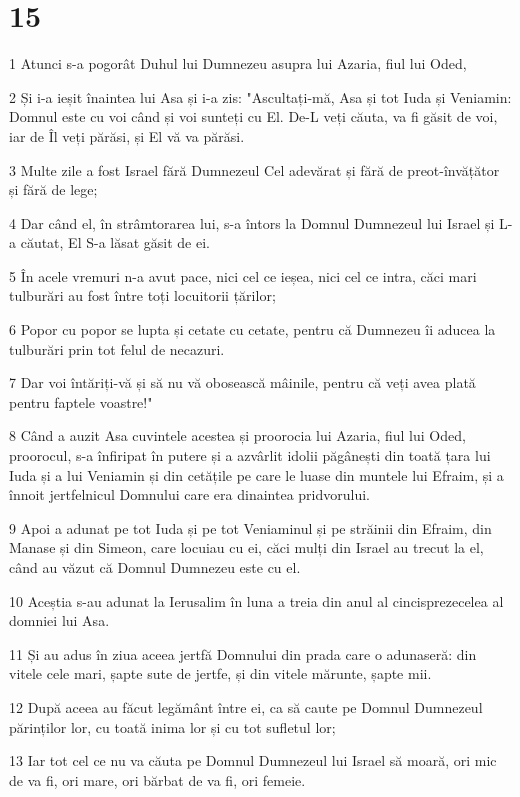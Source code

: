 \chapter{15}

\par 1 Atunci s-a pogorât Duhul lui Dumnezeu asupra lui Azaria, fiul lui Oded,
\par 2 Și i-a ieșit înaintea lui Asa și i-a zis: "Ascultați-mă, Asa și tot Iuda și Veniamin: Domnul este cu voi când și voi sunteți cu El. De-L veți căuta, va fi găsit de voi, iar de Îl veți părăsi, și El vă va părăsi.
\par 3 Multe zile a fost Israel fără Dumnezeul Cel adevărat și fără de preot-învățător și fără de lege;
\par 4 Dar când el, în strâmtorarea lui, s-a întors la Domnul Dumnezeul lui Israel și L-a căutat, El S-a lăsat găsit de ei.
\par 5 În acele vremuri n-a avut pace, nici cel ce ieșea, nici cel ce intra, căci mari tulburări au fost între toți locuitorii țărilor;
\par 6 Popor cu popor se lupta și cetate cu cetate, pentru că Dumnezeu îi aducea la tulburări prin tot felul de necazuri.
\par 7 Dar voi întăriți-vă și să nu vă obosească mâinile, pentru că veți avea plată pentru faptele voastre!"
\par 8 Când a auzit Asa cuvintele acestea și proorocia lui Azaria, fiul lui Oded, proorocul, s-a înfiripat în putere și a azvârlit idolii păgânești din toată țara lui Iuda și a lui Veniamin și din cetățile pe care le luase din muntele lui Efraim, și a înnoit jertfelnicul Domnului care era dinaintea pridvorului.
\par 9 Apoi a adunat pe tot Iuda și pe tot Veniaminul și pe străinii din Efraim, din Manase și din Simeon, care locuiau cu ei, căci mulți din Israel au trecut la el, când au văzut că Domnul Dumnezeu este cu el.
\par 10 Aceștia s-au adunat la Ierusalim în luna a treia din anul al cincisprezecelea al domniei lui Asa.
\par 11 Și au adus în ziua aceea jertfă Domnului din prada care o adunaseră: din vitele cele mari, șapte sute de jertfe, și din vitele mărunte, șapte mii.
\par 12 După aceea au făcut legământ între ei, ca să caute pe Domnul Dumnezeul părinților lor, cu toată inima lor și cu tot sufletul lor;
\par 13 Iar tot cel ce nu va căuta pe Domnul Dumnezeul lui Israel să moară, ori mic de va fi, ori mare, ori bărbat de va fi, ori femeie.
